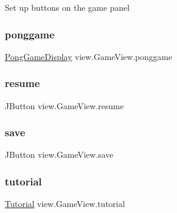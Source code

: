 Set up buttons on the game panel \hypertarget{classview_1_1_game_view_a40ab8540fabeed491fc81dce3e801370}{}\label{classview_1_1_game_view_a40ab8540fabeed491fc81dce3e801370} 
\subsubsection{\texorpdfstring{ponggame}{ponggame}}
{\footnotesize\ttfamily \hyperlink{classview_1_1_pong_game_display}{Pong\+Game\+Display} view.\+Game\+View.\+ponggame\hspace{0.3cm}{\ttfamily [private]}}

\hypertarget{classview_1_1_game_view_a51484e496307a01d4f261b3ab8517171}{}\label{classview_1_1_game_view_a51484e496307a01d4f261b3ab8517171} 
\subsubsection{\texorpdfstring{resume}{resume}}
{\footnotesize\ttfamily J\+Button view.\+Game\+View.\+resume\hspace{0.3cm}{\ttfamily [private]}}

\hypertarget{classview_1_1_game_view_a0c0efd73b4ba0635f2d21d7980407cd0}{}\label{classview_1_1_game_view_a0c0efd73b4ba0635f2d21d7980407cd0} 
\subsubsection{\texorpdfstring{save}{save}}
{\footnotesize\ttfamily J\+Button view.\+Game\+View.\+save\hspace{0.3cm}{\ttfamily [private]}}

\hypertarget{classview_1_1_game_view_a6bc586b3b4e3079253f50adb03864264}{}\label{classview_1_1_game_view_a6bc586b3b4e3079253f50adb03864264} 
\subsubsection{\texorpdfstring{tutorial}{tutorial}}
{\footnotesize\ttfamily \hyperlink{classview_1_1_tutorial}{Tutorial} view.\+Game\+View.\+tutorial\hspace{0.3cm}{\ttfamily [private]}}

